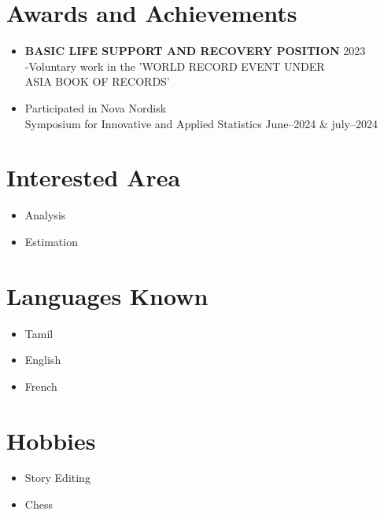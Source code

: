 \documentclass[a4paper,11pt]{article}
\begin{document}
	
	\section*{Awards and Achievements}
	\noindent
	\begin{itemize}
		\item 
		\textbf{BASIC LIFE SUPPORT AND RECOVERY POSITION} \hfill 2023 \\
		-Voluntary work in the 'WORLD RECORD EVENT UNDER \\ ASIA BOOK OF RECORDS'
		\item  Participated in Nova Nordisk \\ Symposium for Innovative and Applied Statistics \hfill June--2024 \& july--2024
	\end{itemize} 
	\section*{Interested Area}
	\begin{itemize}
		\item Analysis 
		\item Estimation 
	\end{itemize}
	\section*{Languages Known}
	\begin{itemize}
		\item Tamil 
		\item English 
		\item French
		
	\end{itemize}
	\section*{Hobbies}
	\begin{itemize}
		\item Story Editing
		\item Chess
	\end{itemize}
\end{document}
